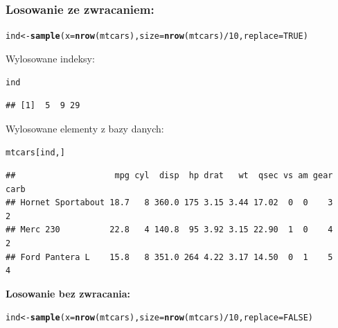 \documentclass[12pt]{mwart}\usepackage[]{graphicx}\usepackage[]{color}
\makeatletter
\newcommand{\hlnum}[1]{\textcolor[rgb]{0.686,0.059,0.569}{#1}}%
\newcommand{\hlopt}[1]{\textcolor[rgb]{0,0,0}{#1}}%
\newcommand{\hlstd}[1]{\textcolor[rgb]{0.345,0.345,0.345}{#1}}%
\newcommand{\hlkwb}[1]{\textcolor[rgb]{0.69,0.353,0.396}{#1}}%
\newcommand{\hlkwc}[1]{\textcolor[rgb]{0.333,0.667,0.333}{#1}}%
\newcommand{\hlkwd}[1]{\textcolor[rgb]{0.737,0.353,0.396}{\textbf{#1}}}%
\newenvironment{kframe}{%
 \def\at@end@of@kframe{}%
 \ifinner\ifhmode%
  \def\at@end@of@kframe{\end{minipage}}%
  \begin{minipage}{\columnwidth}%
 \fi\fi%
 \def\FrameCommand##1{\hskip\@totalleftmargin \hskip-\fboxsep
 \colorbox{shadecolor}{##1}\hskip-\fboxsep
     \hskip-\linewidth \hskip-\@totalleftmargin \hskip\columnwidth}%
 \MakeFramed {\advance\hsize-\width
   \@totalleftmargin\z@ \linewidth\hsize
   \@setminipage}}%
 {\par\unskip\endMakeFramed%
 \at@end@of@kframe}
\newenvironment{knitrout}{}{} %
\makeatother
\begin{document}
\subsubsection*{Losowanie ze zwracaniem:} 
\begin{knitrout}
\color{fgcolor}\begin{kframe}
\begin{alltt}
\hlstd{ind} \hlkwb{<-} \hlkwd{sample}\hlstd{(}\hlkwc{x}\hlstd{=}\hlkwd{nrow}\hlstd{(mtcars),}\hlkwc{size}\hlstd{=}\hlkwd{nrow}\hlstd{(mtcars)}\hlopt{/}\hlnum{10}\hlstd{,}\hlkwc{replace}\hlstd{=}\hlnum{TRUE}\hlstd{)}
\end{alltt}
\end{kframe}
\end{knitrout}
Wylosowane indeksy:
\begin{knitrout}
\color{fgcolor}\begin{kframe}
\begin{alltt}
\hlstd{ind}
\end{alltt}
\begin{verbatim}
## [1]  5  9 29
\end{verbatim}
\end{kframe}
\end{knitrout}
Wylosowane elementy z bazy danych:
\begin{knitrout}\small
{}\color{fgcolor}\begin{kframe}
\begin{alltt}
\hlstd{mtcars[ind,]}
\end{alltt}
\begin{verbatim}
##                    mpg cyl  disp  hp drat   wt  qsec vs am gear carb
## Hornet Sportabout 18.7   8 360.0 175 3.15 3.44 17.02  0  0    3    2
## Merc 230          22.8   4 140.8  95 3.92 3.15 22.90  1  0    4    2
## Ford Pantera L    15.8   8 351.0 264 4.22 3.17 14.50  0  1    5    4
\end{verbatim}
\end{kframe}
\end{knitrout}
\textbf{Losowanie bez zwracania:} 
\begin{knitrout}
\color{fgcolor}\begin{kframe}
\begin{alltt}
\hlstd{ind} \hlkwb{<-} \hlkwd{sample}\hlstd{(}\hlkwc{x}\hlstd{=}\hlkwd{nrow}\hlstd{(mtcars),}\hlkwc{size}\hlstd{=}\hlkwd{nrow}\hlstd{(mtcars)}\hlopt{/}\hlnum{10}\hlstd{,}\hlkwc{replace}\hlstd{=}\hlnum{FALSE}\hlstd{)}
\end{alltt}
\end{kframe}
\end{knitrout}
\end{document}
